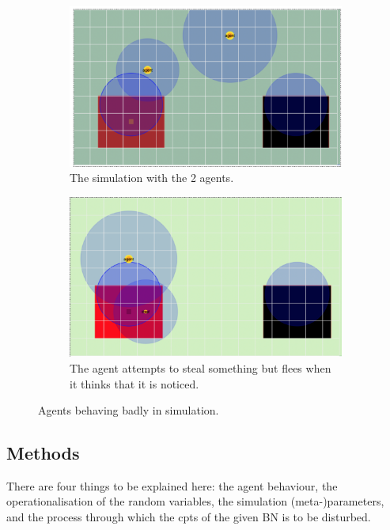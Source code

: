 \begin{figure}[htbp]
\begin{subfigure}{.5\textwidth}
\includegraphics[width=\linewidth]{images/sim1.png}
\caption{The simulation with the 2 agents.}
\end{subfigure}
\begin{subfigure}{.5\textwidth}
\includegraphics[width=\linewidth]{images/stealing.png}
\caption{The agent attempts to steal something but flees when it thinks that it is noticed.}
\end{subfigure}
\caption{Agents behaving badly in simulation.}
\label{env}
\end{figure}

\subsection{Methods}
There are four things to be explained here: the agent behaviour, the operationalisation of the random variables, the simulation (meta-)parameters, and the process through which the cpts of the given BN is to be disturbed.

